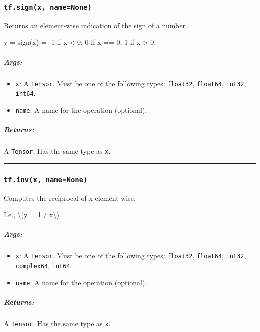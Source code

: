 \subsubsection{\texorpdfstring{\texttt{tf.sign(x,\ name=None)}
}{tf.sign(x, name=None) }}\label{tf.signx-namenone}

Returns an element-wise indication of the sign of a number.

y = sign(x) = -1 if x \textless{} 0; 0 if x == 0; 1 if x \textgreater{}
0.

\subparagraph{Args: }\label{args-8}

\begin{itemize}
\tightlist
\item
  \texttt{x}: A \texttt{Tensor}. Must be one of the following types:
  \texttt{float32}, \texttt{float64}, \texttt{int32}, \texttt{int64}.
\item
  \texttt{name}: A name for the operation (optional).
\end{itemize}

\subparagraph{Returns: }\label{returns-8}

A \texttt{Tensor}. Has the same type as \texttt{x}.

\begin{center}\rule{0.5\linewidth}{\linethickness}\end{center}

\subsubsection{\texorpdfstring{\texttt{tf.inv(x,\ name=None)}
}{tf.inv(x, name=None) }}\label{tf.invx-namenone}

Computes the reciprocal of x element-wise.

I.e., \textbackslash{}(y = 1 / x\textbackslash{}).

\subparagraph{Args: }\label{args-9}

\begin{itemize}
\tightlist
\item
  \texttt{x}: A \texttt{Tensor}. Must be one of the following types:
  \texttt{float32}, \texttt{float64}, \texttt{int32},
  \texttt{complex64}, \texttt{int64}.
\item
  \texttt{name}: A name for the operation (optional).
\end{itemize}

\subparagraph{Returns: }\label{returns-9}

A \texttt{Tensor}. Has the same type as \texttt{x}.

